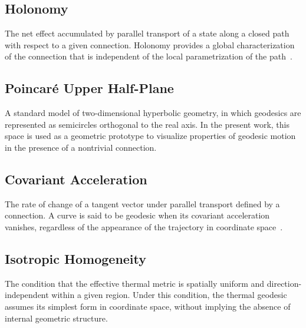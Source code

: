 \documentclass[%
 reprint,
 amsmath,amssymb,
 aps,
 prb,
]{revtex4-2}
\numberwithin{equation}{section}
\begin{document}
\subsection*{Holonomy}
The net effect accumulated by parallel transport of a state along a closed path with respect to a given connection. Holonomy provides a global characterization of the connection that is independent of the local parametrization of the path~\cite{nakahara2003}.

\subsection*{Poincar\'e Upper Half-Plane}
A standard model of two-dimensional hyperbolic geometry, in which geodesics are represented as semicircles orthogonal to the real axis. In the present work, this space is used as a geometric prototype to visualize properties of geodesic motion in the presence of a nontrivial connection.

\subsection*{Covariant Acceleration}
The rate of change of a tangent vector under parallel transport defined by a connection. A curve is said to be geodesic when its covariant acceleration vanishes, regardless of the appearance of the trajectory in coordinate space~\cite{wald1984}.

\subsection*{Isotropic Homogeneity}
The condition that the effective thermal metric is spatially uniform and direction-independent within a given region. Under this condition, the thermal geodesic assumes its simplest form in coordinate space, without implying the absence of internal geometric structure.


\clearpage

\end{document}
